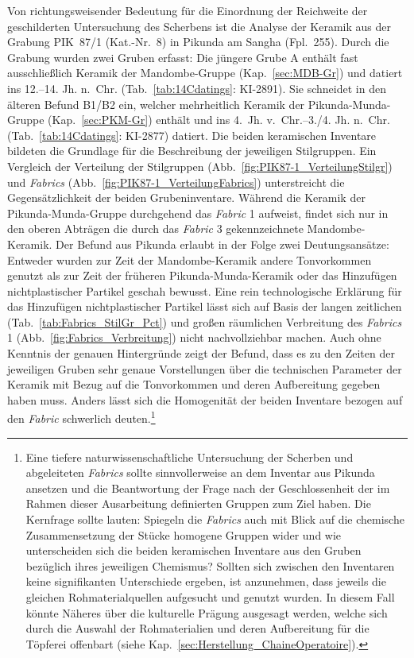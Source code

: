 \begin{multicols}{2}
Von richtungsweisender Bedeutung für die Einordnung der Reichweite der geschilderten Untersuchung des Scherbens ist die Analyse der Keramik aus der Grabung PIK~87/1 (Kat.-Nr.~8) in Pikunda am \mbox{Sangha} (Fpl.~255). Durch die Grabung wurden zwei Gruben erfasst: Die jüngere Grube A enthält fast ausschließlich Keramik der Mandombe-Gruppe (Kap.~\ref{sec:MDB-Gr}) und datiert ins 12.--14. Jh. n.~Chr. (Tab.~\ref{tab:14Cdatings}: KI-2891). Sie schneidet in den älteren Befund B1/B2 ein, welcher mehrheitlich Keramik der Pikunda-Munda-Gruppe (Kap.~\ref{sec:PKM-Gr}) enthält und ins 4.~Jh. v.~Chr.--3./4. Jh. n.~Chr. (Tab.~\ref{tab:14Cdatings}: KI-2877) datiert. Die beiden keramischen Inventare bildeten die Grundlage für die Beschreibung der jeweiligen Stilgruppen. Ein Vergleich der Verteilung der Stilgruppen (Abb.~\ref{fig:PIK87-1_VerteilungStilgr}) und \textit{Fabrics} (Abb.~\ref{fig:PIK87-1_VerteilungFabrics}) unterstreicht die Gegensätzlichkeit der beiden Grubeninventare. Während die Keramik der Pikunda-Munda-Gruppe durchgehend das \textit{Fabric} 1 aufweist, findet sich nur in den oberen Abträgen die durch das \textit{Fabric} 3 gekennzeichnete Mandombe-Keramik. Der Befund aus Pikunda erlaubt in der Folge zwei Deutungsansätze: Entweder wurden zur Zeit der Mandombe-Keramik andere Tonvorkommen genutzt als zur Zeit der früheren Pikunda-Munda-Keramik oder das Hinzufügen nichtplastischer Partikel geschah bewusst. Eine rein technologische Erklärung für das Hinzufügen nichtplastischer Partikel lässt sich auf Basis der langen zeitlichen (Tab.~\ref{tab:Fabrics_StilGr_Pct}) und großen räumlichen Verbreitung des \textit{Fabrics} 1 (Abb.~\ref{fig:Fabrics_Verbreitung}) nicht nachvollziehbar machen. Auch ohne Kenntnis der genauen Hintergründe zeigt der Befund, dass es zu den Zeiten der jeweiligen Gruben sehr genaue Vorstellungen über die technischen Parameter der Keramik mit Bezug auf die Tonvorkommen und deren Aufbereitung gegeben haben muss. Anders lässt sich die Homogenität der beiden Inventare bezogen auf den \textit{Fabric} schwerlich deuten.\footnote{\label{ftn:NaturwissFabric}Eine tiefere naturwissenschaftliche Untersuchung der Scherben und abgeleiteten \textit{Fabrics} sollte sinnvollerweise an dem Inventar aus Pikunda ansetzen und die Beantwortung der Frage nach der Geschlossenheit der im Rahmen dieser Ausarbeitung definierten Gruppen zum Ziel haben. Die Kernfrage sollte lauten: Spiegeln die \textit{Fabrics} auch mit Blick auf die chemische Zusammensetzung der Stücke homogene Gruppen wider und wie unterscheiden sich die beiden keramischen Inventare aus den Gruben bezüglich ihres jeweiligen Chemismus? Sollten sich zwischen den Inventaren keine signifikanten Unterschiede ergeben, ist anzunehmen, dass jeweils die gleichen Rohmaterialquellen aufgesucht und genutzt wurden. In diesem Fall könnte Näheres über die kulturelle Prägung ausgesagt werden, welche sich durch die Auswahl der Rohmaterialien und deren Aufbereitung für die Töpferei offenbart (siehe Kap.~\ref{sec:Herstellung_ChaineOperatoire}).}

\end{multicols}
